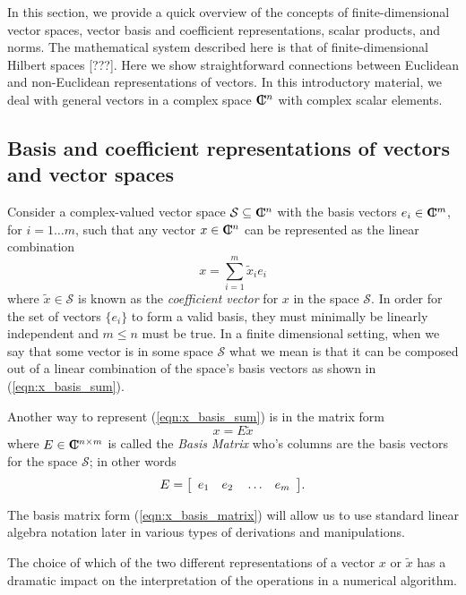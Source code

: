 \documentclass[pdf,ps2pdf,11pt]{SANDreport}
\begin{document}
In this section, we provide a quick overview of the concepts of
finite-dimensional vector spaces, vector basis and coefficient
representations, scalar products, and norms.  The mathematical system
described here is that of finite-dimensional Hilbert spaces [???].  Here we
show straightforward connections between Euclidean and non-Euclidean
representations of vectors.  In this introductory material, we deal with
general vectors in a complex space $\CPLX^n$ with complex scalar elements.

\subsection{Basis and coefficient representations of vectors and vector spaces}

Consider a complex-valued vector space $\mathcal{S} {}\subseteq {}\CPLX^n$ with
the basis vectors $e_i\in\CPLX^m$, for $i=1\ldots{}m$, such that any vector
$x\in\CPLX^n$ can be represented as the linear combination
%
\begin{equation}
x = \sum_{i=1}^{m} \tilde{x}_i e_i
\label{eqn:x_basis_sum}
\end{equation}
%
where $\tilde{x}\in\mathcal{S}$ is known as the {}\textit{coefficient vector}
for $x$ in the space $\mathcal{S}$.  In order for the set of vectors $\{e_i\}$
to form a valid basis, they must minimally be linearly independent and $m
{}\le n$ must be true.  In a finite dimensional setting, when we say that some
vector is in some space $\mathcal{S}$ what we mean is that it can be composed
out of a linear combination of the space's basis vectors as shown in
(\ref{eqn:x_basis_sum}).

Another way to represent (\ref{eqn:x_basis_sum}) is in the matrix form
%
\begin{equation}
x = E \tilde{x}
\label{eqn:x_basis_matrix}
\end{equation}
%
where $E\in\CPLX^{n\times{}m}$ is called the {}\textit{Basis Matrix} who's
columns are the basis vectors for the space $\mathcal{S}$; in other words
%
\begin{equation}
E = {\bmat{cccc} e_1 & e_2 & {}\ldots & e_m {}\emat}.
\end{equation}
%

The basis matrix form (\ref{eqn:x_basis_matrix}) will allow us to use standard
linear algebra notation later in various types of derivations and
manipulations.

The choice of which of the two different representations of a vector $x$ or
$\tilde{x}$ has a dramatic impact on the interpretation of the operations in
a numerical algorithm.
\end{document}
